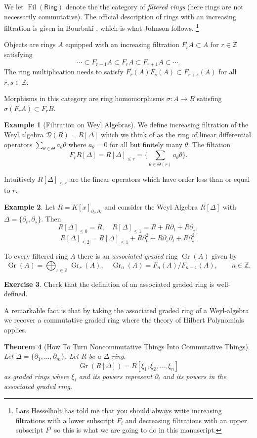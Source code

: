 \documentclass[12pt]{book}
\numberwithin{equation}{section}
\newtheorem{theorem}{Theorem}[subsection]
\theoremstyle{definition}
\newtheorem{example}[theorem]{Example}
\newtheorem{exercise}[theorem]{Exercise}
\theoremstyle{remark}
\newcommand{\ZZ}{\mathbb{Z}}
\newcommand{\Fil}{\operatorname{Fil}}
\newcommand{\Gr}{\operatorname{Gr}}
\newcommand{\Ring}{\mathsf{Ring}}
\begin{document}
We let $\Fil(\Ring)$ denote the the category of \emph{filtered rings} (here rings are not necessarily commutative).
The official description of rings with an increasing filtration is given in Bourbaki \cite[page 17]{Bourbaki1961}, which is what Johnson follows. 
\footnote{Lars Hesselholt has told me that you should always write increasing filtrations with a lower subscript $F_i$ and decreasing filtrations with an upper subscript $F^i$ so this is what we are going to do in this manuscript. }

Objects are rings $A$ equipped with an increasing filtration $F_rA \subset A$ for $r \in \ZZ$ satisfying 
$$ \cdots \subset F_{r-1} A \subset F_r A \subset F_{r+1} A \subset \cdots. $$
The ring multiplication needs to satisfy $F_r(A) F_s(A) \subset F_{r+s}(A)$ for all $r,s \in \ZZ$.

Morphisms in this category are ring homomorphisms $\sigma:A\to B$ satisfing $\sigma(F_rA) \subset F_rB$. 
\begin{example}[Filtration on Weyl Algebras]
	We define increasing filtration of the Weyl algebra $\mathcal{D}(R) = R[\Delta]$ which we think of as the ring of linear differential operators $\sum_{\theta \in \Theta} a_{\theta} \theta$ where $a_{\theta}=0$ for all but finitely many $\theta$. 
	The filtation 
	$$F_rR[\Delta] = R[\Delta]_{\leq r} = \lbrace \sum_{\theta \in \Theta(r)} a_{\theta} \theta \rbrace. $$
\end{example}
Intuitively $R[\Delta]_{\leq r}$ are the linear operators which have order less than or equal to $r$. 

\begin{example}\label{EX:filtration}
	Let $R = K[x]_{\partial_t,\partial_s}$ and consider the Weyl Algebra $R[\Delta]$ with $\Delta = \lbrace \partial_t,\partial_s\rbrace$.
	Then 
	$$ R[\Delta]_{\leq 0} = R, \quad R[\Delta]_{\leq 1 } = R + R\partial_t + R \partial_s,$$
	$$R[\Delta]_{\leq 2} = R[\Delta]_{\leq 1} + R\partial_t^2 + R\partial_s \partial_t + R\partial_s^2.$$
\end{example}

To every filtered ring $A$ there is an \emph{associated graded} ring $\Gr(A)$ given by 
$$\Gr(A) = \bigoplus_{r\in \ZZ} \Gr_r(A), \quad  \Gr_n(A) = F_n(A)/F_{n-1}(A), \qquad n \in \ZZ.$$

\begin{exercise}
	Check that the definition of an associated graded ring is well-defined.
\end{exercise}

A remarkable fact is that by taking the associated graded ring of a Weyl-algebra we recover a commutative graded ring where the theory of Hilbert Polynomials applies. 
\begin{theorem}[How To Turn Noncommutative Things Into Commutative Things]\label{T:associated-graded}
	Let $\Delta = \lbrace \partial_1,\ldots,\partial_m\rbrace$.
	Let $R$ be a $\Delta$-ring. 
	$$\Gr(R[\Delta]) = R[\xi_1,\xi_2,\ldots,\xi_n] $$
	as graded rings where $\xi_i$ and its powers represent $\partial_i$ and its powers in the associated graded ring.
\end{theorem}
\end{document}
